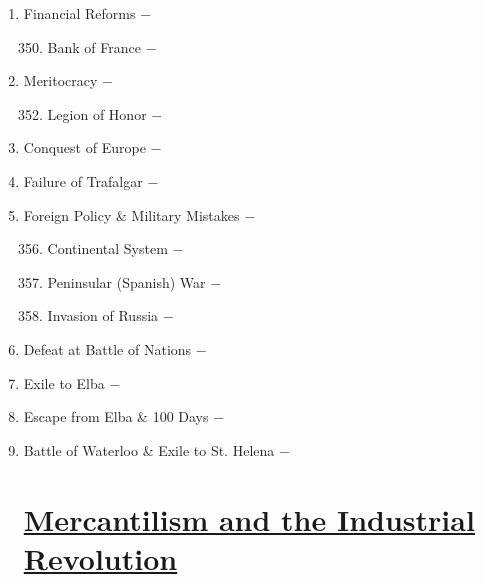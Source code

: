 \documentclass[12pt]{article}
\begin{document}
\begin{enumerate}
\item Financial Reforms $-$ 


\begin{enumerate}[label=\arabic{*}.]
\setcounter{enumii}{349}

\item Bank of France $-$

\end{enumerate}
\setcounter{enumi}{350}

\item Meritocracy $-$ 

\begin{enumerate}[label=\arabic{*}.]
\setcounter{enumii}{351}

\item Legion of Honor $-$ 

\end{enumerate}
\setcounter{enumi}{352}

\item Conquest of Europe $-$ 

\item Failure of Trafalgar $-$ 

\item Foreign Policy \& Military Mistakes $-$ 

\begin{enumerate}[label=\arabic{*}.]
\setcounter{enumii}{355}

\item Continental System $-$

\item Peninsular (Spanish) War $-$

\item Invasion of Russia $-$ 

\end{enumerate}
\setcounter{enumi}{358}

\item Defeat at Battle of Nations $-$ 

\item Exile to Elba $-$ 

\item Escape from Elba \& 100 Days $-$ 

\item Battle of Waterloo \& Exile to St. Helena $-$ 

\section[\underline{Mercantilism, Agricultural Revolution, \& Industrial Revolution}]{\underline{Mercantilism and the Industrial Revolution}}


\end{enumerate}
\end{document}
